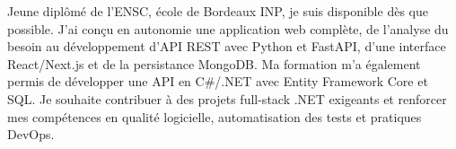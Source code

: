 
\begin{cvparagraph}
Jeune diplômé de l’ENSC, école de Bordeaux INP, je suis disponible dès que possible. J’ai conçu en autonomie une application web complète, de l’analyse du besoin au développement d’API REST avec Python et FastAPI, d’une interface React/Next.js et de la persistance MongoDB. Ma formation m’a également permis de développer une API en C\#/.NET avec Entity Framework Core et SQL. Je souhaite contribuer à des projets full-stack .NET exigeants et renforcer mes compétences en qualité logicielle, automatisation des tests et pratiques DevOps.
\end{cvparagraph}
